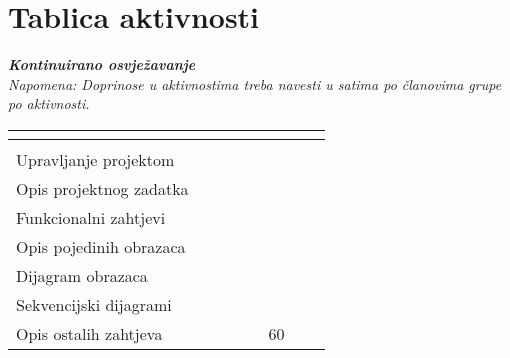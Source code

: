 \begin{packed_enum}
			
		\end{packed_enum}
		
		\eject
		\section*{Tablica aktivnosti}
		
			\textbf{\textit{Kontinuirano osvježavanje}}\\
			
			 \textit{Napomena: Doprinose u aktivnostima treba navesti u satima po članovima grupe po aktivnosti.}
					
						
			
			\begin{longtabu} to \textwidth {|X[7, l]|X[1, c]|X[1, c]|X[1, c]|X[1, c]|X[1, c]|X[1, c]|X[1, c]|}
								
				  &      &  &	 &	 &
				 &
				 &	 \\ \hline 
				\endfirsthead
				
			
				  &      &  &	 &
				 &	 &
				 &	 \\ \hline 
				\endhead
				
				
				\endfoot
							
				 
				\endlastfoot
				
				Upravljanje projektom 		&  &  &  &  &  &  & \\ \hline
				Opis projektnog zadatka 	&  &  &  &  &  &  & \\ \hline
				
				Funkcionalni zahtjevi       &  &  &  &  &  &  &  \\ \hline
				Opis pojedinih obrazaca 	&  &  &  &  &  &  &  \\ \hline
				Dijagram obrazaca 			&  &  &  &  &  &  &  \\ \hline
				Sekvencijski dijagrami 		&  &  &  &  &  &  &  \\ \hline
				Opis ostalih zahtjeva 		&  &  &  &  & 60 &  &  \\ \hline


\end{longtabu}
